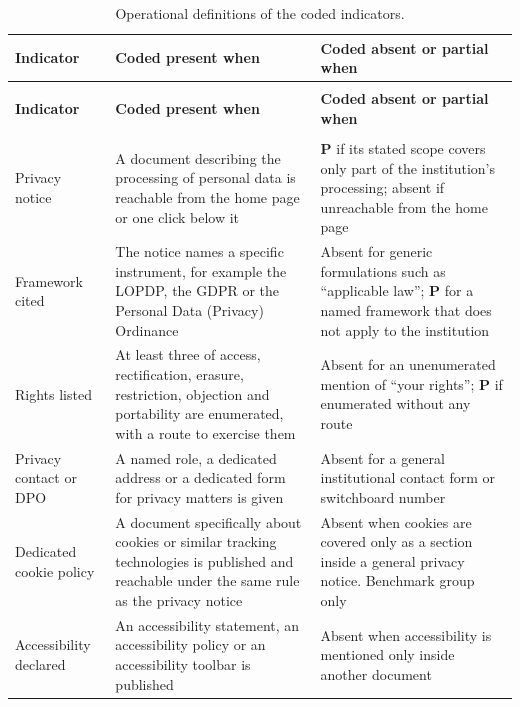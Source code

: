 \documentclass[pdflatex,sn-basic,Numbered,iicol]{sn-jnl}
\theoremstyle{thmstyleone}
\theoremstyle{thmstyletwo}
\theoremstyle{thmstylethree}
\begin{document}
\begin{appendices}
\footnotesize
\begin{longtable}{@{}>{\RaggedRight}p{2.7cm}>{\RaggedRight}p{4.75cm}>{\RaggedRight\arraybackslash}p{4.55cm}@{}}
	\caption{Operational definitions of the coded indicators.}\label{tab:codebook}\\
	\toprule
	\textbf{Indicator} & \textbf{Coded present when} & \textbf{Coded absent or partial when} \\
	\midrule
	\endfirsthead
	\multicolumn{3}{c}{\textit{(Table~\ref{tab:codebook}, continued)}}\\
	\toprule
	\textbf{Indicator} & \textbf{Coded present when} & \textbf{Coded absent or partial when} \\
	\midrule
	\endhead
	\midrule
	\multicolumn{3}{r}{\textit{Continued on next page}}\\
	\endfoot
	\bottomrule
	\endlastfoot
	Privacy notice & A document describing the processing of personal data is reachable from the home page or one click below it & \textbf{P} if its stated scope covers only part of the institution's processing; absent if unreachable from the home page \\
	\addlinespace
	Framework cited & The notice names a specific instrument, for example the LOPDP, the GDPR or the Personal Data (Privacy) Ordinance & Absent for generic formulations such as ``applicable law''; \textbf{P} for a named framework that does not apply to the institution \\
	\addlinespace
	Rights listed & At least three of access, rectification, erasure, restriction, objection and portability are enumerated, with a route to exercise them & Absent for an unenumerated mention of ``your rights''; \textbf{P} if enumerated without any route \\
	\addlinespace
	Privacy contact or DPO & A named role, a dedicated address or a dedicated form for privacy matters is given & Absent for a general institutional contact form or switchboard number \\
	\addlinespace
	Dedicated cookie policy & A document specifically about cookies or similar tracking technologies is published and reachable under the same rule as the privacy notice & Absent when cookies are covered only as a section inside a general privacy notice. Benchmark group only \\
	\addlinespace
	Accessibility declared & An accessibility statement, an accessibility policy or an accessibility toolbar is published & Absent when accessibility is mentioned only inside another document \\

\end{longtable}
\end{appendices}
\end{document}
